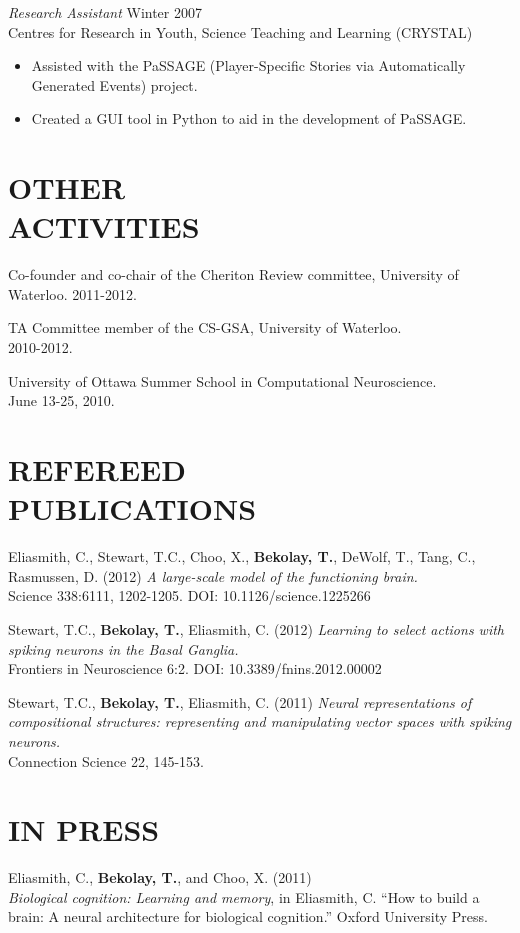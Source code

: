 \documentclass[line,margin]{res}
\begin{document}
\begin{resume}
  {\sl Research Assistant} \hfill Winter 2007 \\
  Centres for Research in Youth, Science Teaching and Learning (CRYSTAL)
  \begin{itemize}  \itemsep -2pt %
    \item Assisted with the PaSSAGE (Player-Specific Stories via Automatically Generated Events) project.
    \item Created a GUI tool in Python to aid in the development of PaSSAGE.
  \end{itemize}

\section{OTHER \\ ACTIVITIES}
  Co-founder and co-chair of the Cheriton Review committee,
  University of Waterloo. 2011-2012.

  TA Committee member of the CS-GSA, University of Waterloo. \\
  2010-2012.

  University of Ottawa Summer School in Computational Neuroscience. \\
  June 13-25, 2010.

\clearpage

\section{REFEREED \\PUBLICATIONS}
  Eliasmith, C., Stewart, T.C., Choo, X., \textbf{Bekolay, T.},
    DeWolf, T., Tang, C., Rasmussen, D. (2012)
    {\sl A large-scale model of the functioning brain.} \\
    Science 338:6111, 1202-1205. DOI: 10.1126/science.1225266

  Stewart, T.C., \textbf{Bekolay, T.}, Eliasmith, C. (2012)
    {\sl Learning to select actions with spiking neurons in the Basal Ganglia.} \\
    Frontiers in Neuroscience 6:2. DOI: 10.3389/fnins.2012.00002

  Stewart, T.C., \textbf{Bekolay, T.}, Eliasmith, C. (2011)
    {\sl Neural representations of compositional structures: representing and manipulating vector spaces with spiking neurons.} \\
    Connection Science 22, 145-153.

\section{IN PRESS}
  Eliasmith, C., \textbf{Bekolay, T.}, and Choo, X. (2011) \\
   {\sl Biological cognition: Learning and memory}, in Eliasmith, C. ``How to build a brain: A neural architecture for biological cognition.'' Oxford University Press.


\end{resume}
\end{document}
